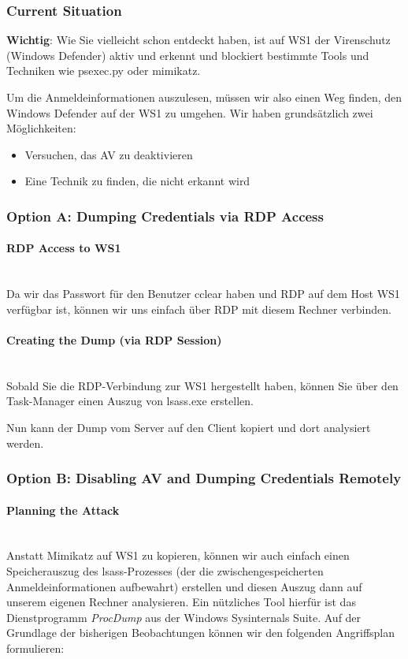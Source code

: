\subsubsection{Current Situation}
\textbf{Wichtig}: Wie Sie vielleicht schon entdeckt haben, ist auf WS1 der Virenschutz (Windows Defender) aktiv und erkennt und blockiert bestimmte Tools und Techniken wie psexec.py oder mimikatz.

Um die Anmeldeinformationen auszulesen, müssen wir also einen Weg finden, den Windows Defender auf der WS1 zu umgehen. Wir haben grundsätzlich zwei Möglichkeiten:\\
\begin{itemize}
    \item Versuchen, das AV zu deaktivieren
    \item Eine Technik zu finden, die nicht erkannt wird
\end{itemize} 

\subsubsection{Option A: Dumping Credentials via RDP Access}
\paragraph{RDP Access to WS1}\mbox{} \\
Da wir das Passwort für den Benutzer cclear haben und RDP auf dem Host WS1 verfügbar ist, können wir uns einfach über RDP mit diesem Rechner verbinden.

\paragraph{Creating the Dump (via RDP Session)}\mbox{} \\
Sobald Sie die RDP-Verbindung zur WS1 hergestellt haben, können Sie über den Task-Manager einen Auszug von lsass.exe erstellen.

Nun kann der Dump vom Server auf den Client kopiert und dort analysiert werden.

\subsubsection{Option B: Disabling AV and Dumping Credentials Remotely}

\paragraph{Planning the Attack}\mbox{} \\
Anstatt Mimikatz auf WS1 zu kopieren, können wir auch einfach einen Speicherauszug des lsass-Prozesses (der die zwischengespeicherten Anmeldeinformationen aufbewahrt) erstellen und diesen Auszug dann auf unserem eigenen Rechner analysieren.
Ein nützliches Tool hierfür ist das Dienstprogramm \textcolor{OSTPink}{\textit{ProcDump}} aus der Windows Sysinternals Suite.
Auf der Grundlage der bisherigen Beobachtungen können wir den folgenden Angriffsplan formulieren:\\

